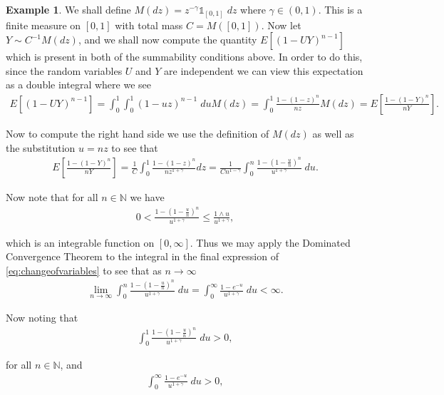 \documentclass[11pt]{article}
\theoremstyle{definition}
\newtheorem{example}{Example}
\newcommand{\N}{\mathbb{N}}
\begin{document}
\begin{example}
    We shall define $M(dz) = z^{-\gamma}\mathds{1}_{[0,1]}\;dz$ where $\gamma \in (0,1)$. This is a finite measure on $[0,1]$ with total mass $C = M([0,1])$. Now let $Y \sim C^{-1}M(dz)$, and we shall now compute the quantity $E[(1-UY)^{n-1}]$ which is present in both of the summability conditions above. In order to do this, since the random variables $U$ and $Y$ are independent we can view this expectation as a double integral where we see
    \begin{align}\label{eq:computationofEW}
        E[(1-UY)^{n-1}] =\!\! \int_0^1\!\!\!\int_0^1 (1- uz)^{n-1}\;du M(dz) =\!\! \int_0^1 \frac{1-(1-z)^{n}}{nz}M(dz) = E\left[\frac{1-(1-Y)^n}{nY}\right].
    \end{align}

    \noindent Now to compute the right hand side we use the definition of $M(dz)$ as well as the substitution $u = nz$ to see that
    \begin{align}\label{eq:changeofvariables}
        E\left[\frac{1-(1-Y)^n}{nY}\right] = \frac{1}{C}\int_0^1 \frac{1-(1-z)^{n}}{nz^{1+\gamma}}dz = \frac{1}{Cn^{1-\gamma}}\int_0^n \frac{1-(1 - \frac{u}{n})^n}{u^{1+\gamma}}\;du.
    \end{align}

    \noindent Now note that for all $n \in \N$ we have 
    \begin{align*}
        0 <\frac{1-(1 - \frac{u}{n})^n}{u^{1+\gamma}} \leq \frac{1 \wedge u}{u^{1+\gamma}},
    \end{align*}
    
    \noindent which is an integrable function on $[0,\infty]$. Thus we may apply the Dominated Convergence Theorem to the integral in the final expression of \eqref{eq:changeofvariables} to see that as $n \to \infty$ 
    \begin{align*}
        \lim_{n \to \infty}\int_0^n \frac{1-(1 - \frac{u}{n})^n}{u^{1+\gamma}}\;du = \int_0^\infty \frac{1 - e^{-u}}{u^{1 + \gamma}}\;du < \infty.
    \end{align*}

    \noindent Now noting that
    \begin{align*}
        \int_0^1\frac{1-(1 - \frac{u}{n})^n}{u^{1+\gamma}}\;du > 0,
    \end{align*}

    \noindent for all $n \in \N$, and
    \begin{align*}
        \int_0^\infty\frac{1 - e^{-u}}{u^{1 + \gamma}}\;du > 0,
    \end{align*}
    

\end{example}
\end{document}
